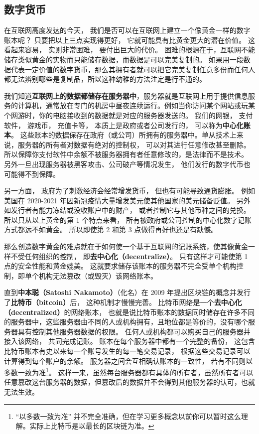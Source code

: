 \subsection{数字货币}
在互联网高度发达的今天， 我们是否可以在互联网上建立一个像黄金一样的数字账本呢？ 只要把以上三点实现得更好， 它就可能具有比黄金更大的潜在价值。 这看起来容易， 实则非常困难， 要付出巨大的代价。 困难的根源在于，互联网不能储存类似黄金的实物而只能储存数据，而数据是可以完美复制的。 如果用一段数据代表一定价值的数字货币，那么其拥有者就可以把它完美复制任意多份而任何人都无法辨别哪些是复制品，所以这种幼稚的方法注定是行不通的。

我们知道\textbf{互联网上的数据都储存在服务器中}，服务器就是互联网上用于提供信息服务的计算机，通常放在专门的机房中昼夜连续运行。例如当你访问某个网站或玩某个网游时，你的电脑接收到的数据就是对应的服务器发送的。 我们的网银， 支付软件， 游戏币， 充值卡等， 本质上是政府或者公司发行的， 可以称为\textbf{中心化账本}。 这些账本的数据保存在政府（或公司）所拥有的服务器中。单从技术上来说，服务器的所有者对数据有绝对的控制权， 可以对其进行任意修改甚至删除。 所以保障你支付软件中余额不被服务器拥有者任意修改的，是法律而不是技术。 另外一旦出现服务器被黑客攻击、公司破产等情况发生， 他们发行的数字代币也可能得不到保障。

另一方面， 政府为了刺激经济会经常增发货币， 但也有可能导致通货膨胀。 例如美国在 2020-2021 年因新冠疫情大量增发美元使其他国家的美元储备贬值。 另外如发行者有能力冻结或没收账户中的财产， 或者控制它与其他币种之间的兑换。 所以只从以上黄金的第 1 个特点来看， 所有被政府或公司控制的中心化数字记账方式都远不如黄金。 所以即使第 2 和第 3 点做得再好也还是有缺憾。

那么创造数字黄金的难点就在于如何使一个基于互联网的记账系统，使其像黄金一样不受任何组织的控制， 即\textbf{去中心化（decentralize）}。 只有这样才可能使第 1 点的安全性能和黄金媲美。 这就要求储存该账本的服务器不完全受单个机构控制，即单个机构无法篡改（或毁灭）该网络账本。

直到\textbf{中本聪（Satoshi Nakamoto）}（化名）在 2009 年提出区块链的概念并发行了\textbf{比特币（bitcoin）}后， 这种机制才慢慢完善。 比特币网络是一个\textbf{去中心化（decentralized）}的网络账本， 也就是说比特币账本的数据同时储存在许多不同的服务器中，这些服务器由不同的人或机构拥有，且地位都是等价的，没有哪个服务器具有控制其他服务器数据的权限。 任何人或机构都可以购买自己的服务器并接入该网络， 共同完成记账。 账本在每个服务器中都有一个完整的备份， 这包含比特币账本有史以来每一个账号发生的每一笔交易记录， 根据这些交易记录可以计算得到每个账户的余额。 服务器之间会互相确认账本的一致性， 若有不同则以多数一致为准\footnote{“以多数一致为准” 并不完全准确，但在学习更多概念以前你可以暂时这么理解。实际上比特币是以最长的区块链为准。}。 这样一来，虽然每台服务器都有具体的所有者，虽然所有者可以任意篡改这台服务器的数据，但篡改后的数据并不会得到其他服务器的认可，也就无法生效。

